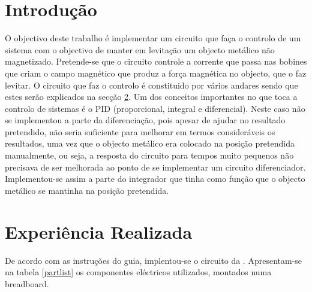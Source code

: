 \documentclass[%
  reprint,
  nofootinbib,
  amsmath,amssymb,
  aps,
  10pt,
  a4paper
]{revtex4-1}
\begin{document}
\section{Introdução}
\label{s:intro}

O objectivo deste trabalho é implementar um circuito que faça o controlo de um sistema com o objectivo de manter em levitação um objecto metálico não magnetizado. Pretende-se que o circuito controle a corrente que passa nas bobines que criam o campo magnético que produz a força magnética no objecto, que o faz levitar. O circuito que faz o controlo é constituido por vários andares sendo que estes serão explicados na secção \ref{s:expreal}. Um dos conceitos importantes no que toca a controlo de sistemas é o PID (proporcional, integral e diferencial). Neste caso não se implementou a parte da diferenciação, pois apesar de ajudar no resultado pretendido, não seria suficiente para melhorar em termos consideráveis os resultados, uma vez que o objecto metálico era colocado na posição pretendida manualmente, ou seja, a resposta do circuito para tempos muito pequenos não precisava de ser melhorada ao ponto de se implementar um circuito diferenciador. Implementou-se assim a parte do integrador que tinha como função que o objecto metálico se mantinha na posição pretendida.


\section{Experiência Realizada}
\label{s:expreal}
De acordo com as instruções do guia, implentou-se o circuito da . Apresentam-se na tabela \ref{partlist} os componentes eléctricos utilizados, montados numa breadboard.

\end{document}
